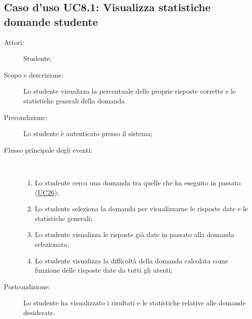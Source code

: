 \subsection{Caso d'uso UC8.1: Visualizza statistiche domande studente}\begin{description}
\item[Attori:] Studente;
\item[Scopo e descrizione:] Lo studente visualizza la percentuale delle proprie risposte corrette e le statistiche generali della domanda
      \item[Precondizione:] Lo studente è autenticato presso il sistema;

        \item[Flusso principale degli eventi:] \ 
 \begin{enumerate}
          \item Lo studente cerca una domanda tra quelle che ha eseguito in passato (\hyperlink{UC26}{UC26});
          \item Lo studente seleziona la domanda per visualizzarne le risposte date e le statistiche generali;
          \item Lo studente visualizza le risposte già date in passato alla domanda selezionata;
          \item Lo studente visualizza la difficoltà della domanda calcolata come funzione delle risposte date da tutti gli utenti;

      \end{enumerate}
    \item[Postcondizione:] Lo studente ha visualizzato i risultati e le statistiche relative alle domande desiderate.
  \end{description}
\hypertarget{UC8.2}{}
